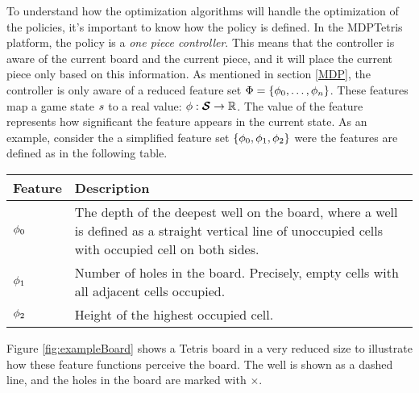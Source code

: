 To understand how the optimization algorithms will handle 
the optimization of the policies, it's important to
know how the policy is defined. In the MDPTetris platform,
the policy is a \textit{one piece controller}. This means that the controller
is aware of the current board and the current piece, and it will place
the current piece only based on this information. As mentioned 
in section \ref{MDP}, the controller is only aware of a reduced 
feature set $\Phi = \{\phi_0,\dots,\phi_n\}$.
These features map a game state $s$ to a real value:
$\phi : \boldsymbol{\mathcal{S}} \rightarrow \mathbb{R}$. The value of the 
feature represents how significant the feature appears in the current
state. As an example, consider the a simplified feature set 
$\{\phi_0,\phi_1,\phi_2\}$ were the features are defined 
as in the following table.

\begin{center}
\begin{tabular}{l L{10cm}}
\textbf{Feature} & \textbf{Description}\\
\hline
$\phi_0$ & 
The depth of the deepest 
well on the board, where a well
is defined as a straight vertical 
line of unoccupied cells with 
occupied cell on both sides.\\
\hline
$\phi_1$ & 
Number of holes in the board. Precisely, empty cells
with all adjacent cells occupied.\\
\hline
$\phi_2$ & Height of the highest occupied cell.\\
\hline
\end{tabular}
\end{center}

Figure \ref{fig:exampleBoard} shows a Tetris board in a very reduced size
to illustrate how these feature functions perceive the board.
The well is shown as a dashed line, and the holes in the board 
are marked with $\times$.


